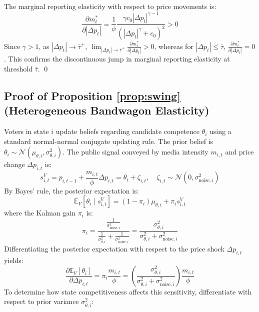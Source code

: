 \documentclass[12pt, a4paper]{article}
\begin{document}
The marginal reporting elasticity with respect to price movements is:
\begin{equation}
\frac{\partial m_t^*}{\partial |\Delta p_t|} = \frac{1}{\psi} \frac{\gamma c_0 |\Delta p_t|^{\gamma - 1}}{\left( |\Delta p_t|^\gamma + c_0 \right)^2} > 0
\end{equation}
Since $\gamma > 1$, as $|\Delta p_t| \to \bar{\tau}^+$, $\lim_{|\Delta p_t| \to \bar{\tau}^+} \frac{\partial m_t^*}{\partial |\Delta p_t|} > 0$, whereas for $|\Delta p_t| \le \bar{\tau}$, $\frac{\partial m_t^*}{\partial |\Delta p_t|} = 0$. This confirms the discontinuous jump in marginal reporting elasticity at threshold $\bar{\tau}$. \qed

\subsection{Proof of Proposition \ref{prop:swing} (Heterogeneous Bandwagon Elasticity)}
\label{app:proof_prop2}
Voters in state $i$ update beliefs regarding candidate competence $\theta_i$ using a standard normal-normal conjugate updating rule. The prior belief is $\theta_i \sim \mathcal{N}(\mu_{\theta, i}, \sigma_{\theta, i}^2)$. The public signal conveyed by media intensity $m_{i,t}$ and price change $\Delta p_{i,t}$ is:
\begin{equation}
s_{i,t}^V = p_{i,t-1} + \frac{m_{i,t}}{\phi} \Delta p_{i,t} = \theta_i + \zeta_{i,t}, \quad \zeta_{i,t} \sim \mathcal{N}(0, \sigma_{\text{noise}, i}^2)
\end{equation}
By Bayes' rule, the posterior expectation is:
\begin{equation}
\mathbb{E}_V[\theta_i \mid s_{i,t}^V] = (1 - \pi_i) \mu_{\theta, i} + \pi_i s_{i,t}^V
\end{equation}
where the Kalman gain $\pi_i$ is:
\begin{equation}
\pi_i = \frac{\frac{1}{\sigma_{\text{noise}, i}^2}}{\frac{1}{\sigma_{\theta, i}^2} + \frac{1}{\sigma_{\text{noise}, i}^2}} = \frac{\sigma_{\theta, i}^2}{\sigma_{\theta, i}^2 + \sigma_{\text{noise}, i}^2}
\end{equation}
Differentiating the posterior expectation with respect to the price shock $\Delta p_{i,t}$ yields:
\begin{equation}
\frac{\partial \mathbb{E}_V[\theta_i]}{\partial \Delta p_{i,t}} = \pi_i \frac{m_{i,t}}{\phi} = \left( \frac{\sigma_{\theta, i}^2}{\sigma_{\theta, i}^2 + \sigma_{\text{noise}, i}^2} \right) \frac{m_{i,t}}{\phi}
\end{equation}
To determine how state competitiveness affects this sensitivity, differentiate with respect to prior variance $\sigma_{\theta, i}^2$:
\end{document}
